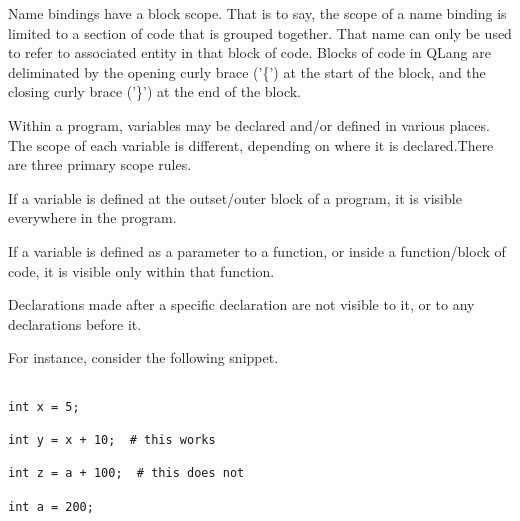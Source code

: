 Name bindings have a block scope. That is to say, the scope of a name binding
is limited to a section of code that is grouped together. That name can only be
used to refer to associated entity in that block of code. Blocks of code in
QLang are deliminated by the opening curly brace ('\{') at the start of the
block, and the closing curly brace ('\}') at the end of the block. 

Within a program, variables may be declared and/or defined  in various places. The scope of each variable is different, depending on where it is declared.There are three primary scope rules.

If a variable is defined at the outset/outer block of a program, it is visible everywhere in the program.

If a variable is defined as a parameter to a function, or inside a function/block of code, it is visible only within that function.

Declarations made after a specific declaration are not visible to it, or to any declarations before it.

For instance, consider the following snippet.

\begin{lstlisting}

int x = 5;

int y = x + 10;  # this works

int z = a + 100;  # this does not

int a = 200; 
\end{lstlisting}
